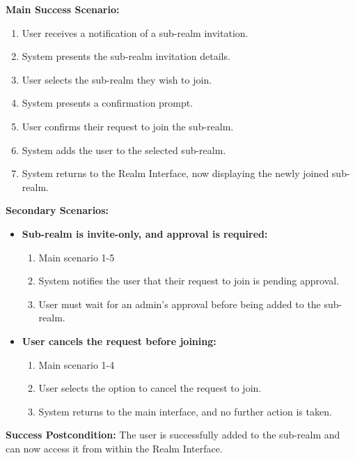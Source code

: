\documentclass{article}
\begin{document}
\begin{enumerate}[label=\textbf{UC\arabic*}]
          \textbf{Main Success Scenario:}
          \begin{enumerate}[label=\textbf{\arabic*.}]
              \item User receives a notification of a sub-realm invitation.
              \item System presents the sub-realm invitation details.
              \item User selects the sub-realm they wish to join.
              \item System presents a confirmation prompt.
              \item User confirms their request to join the sub-realm.
              \item System adds the user to the selected sub-realm.
              \item System returns to the Realm Interface, now displaying the newly joined sub-realm.
          \end{enumerate}

          \textbf{Secondary Scenarios:}
          \begin{itemize}
              \item[{}] \textbf{Sub-realm is invite-only, and approval is required:}
                  \begin{enumerate}[label=\textbf{\arabic*.}]
                      \item Main scenario 1-5
                      \item System notifies the user that their request to join is pending approval.
                      \item User must wait for an admin’s approval before being added to the sub-realm.
                  \end{enumerate}

              \item[{}] \textbf{User cancels the request before joining:}
                  \begin{enumerate}[label=\textbf{\arabic*.}]
                      \item Main scenario 1-4
                      \item User selects the option to cancel the request to join.
                      \item System returns to the main interface, and no further action is taken.
                  \end{enumerate}
          \end{itemize}

          \textbf{Success Postcondition:} The user is successfully added to the sub-realm and can now access it from within the Realm Interface.


\end{enumerate}
\end{document}

